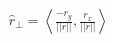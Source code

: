 \documentclass[preview]{standalone}
\begin{document}
\begin{align*}
\hat{r}_\bot = \left\langle \frac{-r_y}{||r||},\frac{r_x}{||r||} \right\rangle
\end{align*}
\end{document}
